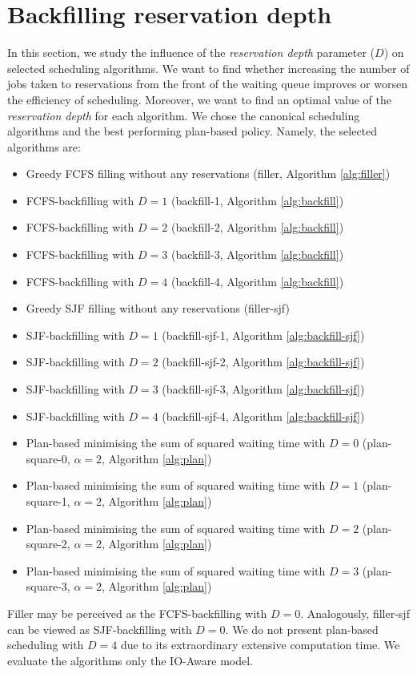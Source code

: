 \documentclass[thesis-en.tex]{subfiles}
\begin{document}
\section{Backfilling reservation depth} \label{sec:depth}
In this section, we study the influence of the \emph{reservation depth} parameter ($D$) on selected scheduling algorithms. We want to find whether increasing the number of jobs taken to reservations from the front of the waiting queue improves or worsen the efficiency of scheduling. Moreover, we want to find an optimal value of the \emph{reservation depth} for each algorithm. We chose the canonical scheduling algorithms and the best performing plan-based policy. Namely, the selected algorithms are:
\begin{itemize}
    \item Greedy FCFS filling without any reservations (filler, Algorithm \ref{alg:filler})
    \item FCFS-backfilling with $D=1$ (backfill-1, Algorithm \ref{alg:backfill})
    \item FCFS-backfilling with $D=2$ (backfill-2, Algorithm \ref{alg:backfill})
    \item FCFS-backfilling with $D=3$ (backfill-3, Algorithm \ref{alg:backfill})
    \item FCFS-backfilling with $D=4$ (backfill-4, Algorithm \ref{alg:backfill})
    \item Greedy SJF filling without any reservations (filler-sjf)
    \item SJF-backfilling with $D=1$ (backfill-sjf-1, Algorithm \ref{alg:backfill-sjf})
    \item SJF-backfilling with $D=2$ (backfill-sjf-2, Algorithm \ref{alg:backfill-sjf})
    \item SJF-backfilling with $D=3$ (backfill-sjf-3, Algorithm \ref{alg:backfill-sjf})
    \item SJF-backfilling with $D=4$ (backfill-sjf-4, Algorithm \ref{alg:backfill-sjf})
    \item Plan-based minimising the sum of squared waiting time with $D=0$ (plan-square-0, $\alpha=2$, Algorithm \ref{alg:plan})
    \item Plan-based minimising the sum of squared waiting time with $D=1$ (plan-square-1, $\alpha=2$, Algorithm \ref{alg:plan})
    \item Plan-based minimising the sum of squared waiting time with $D=2$ (plan-square-2, $\alpha=2$, Algorithm \ref{alg:plan})
    \item Plan-based minimising the sum of squared waiting time with $D=3$ (plan-square-3, $\alpha=2$, Algorithm \ref{alg:plan})
\end{itemize}
Filler may be perceived as the FCFS-backfilling with $D=0$. Analogously, filler-sjf can be viewed as SJF-backfilling with $D=0$. We do not present plan-based scheduling with $D=4$ due to its extraordinary extensive computation time. We evaluate the algorithms only the IO-Aware model.
\end{document}
